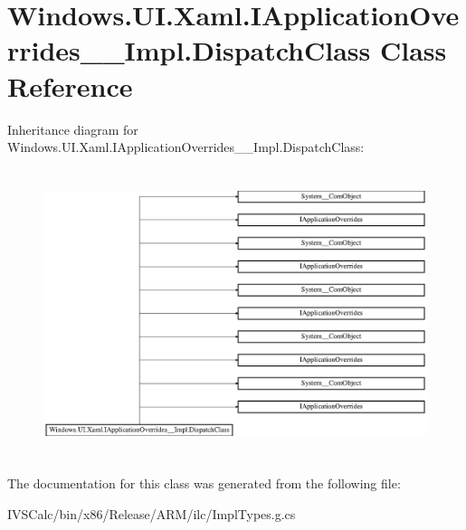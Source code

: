 \hypertarget{class_windows_1_1_u_i_1_1_xaml_1_1_i_application_overrides_____impl_1_1_dispatch_class}{}\section{Windows.\+U\+I.\+Xaml.\+I\+Application\+Overrides\+\_\+\+\_\+\+Impl.\+Dispatch\+Class Class Reference}
\label{class_windows_1_1_u_i_1_1_xaml_1_1_i_application_overrides_____impl_1_1_dispatch_class}
Inheritance diagram for Windows.\+U\+I.\+Xaml.\+I\+Application\+Overrides\+\_\+\+\_\+\+Impl.\+Dispatch\+Class\+:\begin{figure}[H]
\begin{center}
\leavevmode
\includegraphics[height=8.461538cm]{class_windows_1_1_u_i_1_1_xaml_1_1_i_application_overrides_____impl_1_1_dispatch_class}
\end{center}
\end{figure}


The documentation for this class was generated from the following file\+:\begin{DoxyCompactItemize}
\item 
I\+V\+S\+Calc/bin/x86/\+Release/\+A\+R\+M/ilc/Impl\+Types.\+g.\+cs\end{DoxyCompactItemize}
